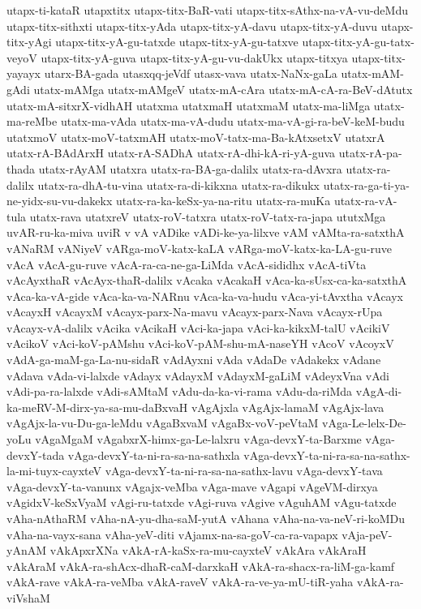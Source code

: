 {utapx-ti-kataR
utapxtitx
utapx-titx-BaR-vati
utapx-titx-sAthx-na-vA-vu-deMdu
utapx-titx-sithxti
utapx-titx-yAda
utapx-titx-yA-davu
utapx-titx-yA-duvu
utapx-titx-yAgi
utapx-titx-yA-gu-tatxde
utapx-titx-yA-gu-tatxve
utapx-titx-yA-gu-tatx-veyoV
utapx-titx-yA-guva
utapx-titx-yA-gu-vu-dakUkx
utapx-titxya
utapx-titx-yayayx
utarx-BA-gada
utasxqq-jeVdf
utasx-vava
utatx-NaNx-gaLa
utatx-mAM-gAdi
utatx-mAMga
utatx-mAMgeV
utatx-mA-cAra
utatx-mA-cA-ra-BeV-dAtutx
utatx-mA-sitxrX-vidhAH
utatxma
utatxmaH
utatxmaM
utatx-ma-liMga
utatx-ma-reMbe
utatx-ma-vAda
utatx-ma-vA-dudu
utatx-ma-vA-gi-ra-beV-keM-budu
utatxmoV
utatx-moV-tatxmAH
utatx-moV-tatx-ma-Ba-kAtxsetxV
utatxrA
utatx-rA-BAdArxH
utatx-rA-SADhA
utatx-rA-dhi-kA-ri-yA-guva
utatx-rA-pa-thada
utatx-rAyAM
utatxra
utatx-ra-BA-ga-dalilx
utatx-ra-dAvxra
utatx-ra-dalilx
utatx-ra-dhA-tu-vina
utatx-ra-di-kikxna
utatx-ra-dikukx
utatx-ra-ga-ti-ya-ne-yidx-su-vu-dakekx
utatx-ra-ka-keSx-ya-na-ritu
utatx-ra-muKa
utatx-ra-vA-tula
utatx-rava
utatxreV
utatx-roV-tatxra
utatx-roV-tatx-ra-japa
ututxMga
uvAR-ru-ka-miva
uviR
v
vA
vADike
vADi-ke-ya-lilxve
vAM
vAMta-ra-satxthA
vANaRM
vANiyeV
vARga-moV-katx-kaLA
vARga-moV-katx-ka-LA-gu-ruve
vAcA
vAcA-gu-ruve
vAcA-ra-ca-ne-ga-LiMda
vAcA-sididhx
vAcA-tiVta
vAcAyxthaR
vAcAyx-thaR-dalilx
vAcaka
vAcakaH
vAca-ka-sUsx-ca-ka-satxthA
vAca-ka-vA-gide
vAca-ka-va-NARnu
vAca-ka-va-hudu
vAca-yi-tAvxtha
vAcayx
vAcayxH
vAcayxM
vAcayx-parx-Na-mavu
vAcayx-parx-Nava
vAcayx-rUpa
vAcayx-vA-dalilx
vAcika
vAcikaH
vAci-ka-japa
vAci-ka-kikxM-talU
vAcikiV
vAcikoV
vAci-koV-pAMshu
vAci-koV-pAM-shu-mA-naseYH
vAcoV
vAcoyxV
vAdA-ga-maM-ga-La-nu-sidaR
vAdAyxni
vAda
vAdaDe
vAdakekx
vAdane
vAdava
vAda-vi-lalxde
vAdayx
vAdayxM
vAdayxM-gaLiM
vAdeyxVna
vAdi
vAdi-pa-ra-lalxde
vAdi-sAMtaM
vAdu-da-ka-vi-rama
vAdu-da-riMda
vAgA-di-ka-meRV-M-dirx-ya-sa-mu-daBxvaH
vAgAjxla
vAgAjx-lamaM
vAgAjx-lava
vAgAjx-la-vu-Du-ga-leMdu
vAgaBxvaM
vAgaBx-voV-peVtaM
vAga-Le-lelx-De-yoLu
vAgaMgaM
vAgabxrX-himx-ga-Le-lalxru
vAga-devxY-ta-Barxme
vAga-devxY-tada
vAga-devxY-ta-ni-ra-sa-na-sathxla
vAga-devxY-ta-ni-ra-sa-na-sathx-la-mi-tuyx-cayxteV
vAga-devxY-ta-ni-ra-sa-na-sathx-lavu
vAga-devxY-tava
vAga-devxY-ta-vanunx
vAgajx-veMba
vAga-mave
vAgapi
vAgeVM-dirxya
vAgidxV-keSxVyaM
vAgi-ru-tatxde
vAgi-ruva
vAgive
vAguhAM
vAgu-tatxde
vAha-nAthaRM
vAha-nA-yu-dha-saM-yutA
vAhana
vAha-na-va-neV-ri-koMDu
vAha-na-vayx-sana
vAha-yeV-diti
vAjamx-na-sa-goV-ca-ra-vapapx
vAja-peV-yAnAM
vAkApxrXNa
vAkA-rA-kaSx-ra-mu-cayxteV
vAkAra
vAkAraH
vAkAraM
vAkA-ra-shAcx-dhaR-caM-darxkaH
vAkA-ra-shacx-ra-liM-ga-kamf
vAkA-rave
vAkA-ra-veMba
vAkA-raveV
vAkA-ra-ve-ya-mU-tiR-yaha
vAkA-ra-viVshaM
}
